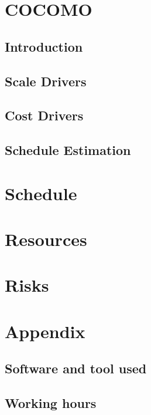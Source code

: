 \documentclass[]{report}
\begin{document}
\chapter{COCOMO}

	\section{Introduction}
	
	
	\section{Scale Drivers}
	
	
	\section{Cost Drivers}
	
	
	\section{Schedule Estimation}
	

\chapter{Schedule}

\chapter{Resources}

\chapter{Risks}

\appendix

\chapter{Appendix}

	\section{Software and tool used}
	

	\section{Working hours}
	
\end{document}
